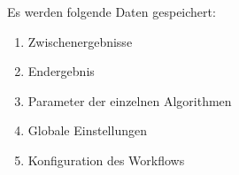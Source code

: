 	Es werden folgende Daten gespeichert:
\begin{enumerate}[align=left,leftmargin=4em, label={\textbf{\textbackslash PD10\arabic*0\textbackslash}} ]
	\item Zwischenergebnisse
	\item Endergebnis
	\item Parameter der einzelnen Algorithmen
	\item Globale Einstellungen
	\item Konfiguration des Workflows
\end{enumerate}	